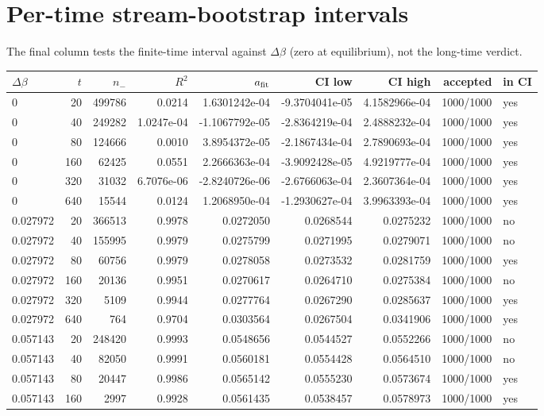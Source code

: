 \documentclass[10pt]{article}
\begin{document}
\section*{Per-time stream-bootstrap intervals}
The final column tests the finite-time interval against $\Delta\beta$ (zero at equilibrium), not the long-time verdict.
\scriptsize\begin{longtable}{lrrrrrrrl}
\toprule $\Delta\beta$ & $t$ & $n_-$ & $R^2$ & $a_{\rm fit}$ & CI low & CI high & accepted & in CI \\
\midrule\endhead
0 & 20 & 499786 & 0.0214 & 1.6301242e-04 & -9.3704041e-05 & 4.1582966e-04 & 1000/1000 & yes \\
0 & 40 & 249282 & 1.0247e-04 & -1.1067792e-05 & -2.8364219e-04 & 2.4888232e-04 & 1000/1000 & yes \\
0 & 80 & 124666 & 0.0010 & 3.8954372e-05 & -2.1867434e-04 & 2.7890693e-04 & 1000/1000 & yes \\
0 & 160 & 62425 & 0.0551 & 2.2666363e-04 & -3.9092428e-05 & 4.9219777e-04 & 1000/1000 & yes \\
0 & 320 & 31032 & 6.7076e-06 & -2.8240726e-06 & -2.6766063e-04 & 2.3607364e-04 & 1000/1000 & yes \\
0 & 640 & 15544 & 0.0124 & 1.2068950e-04 & -1.2930627e-04 & 3.9963393e-04 & 1000/1000 & yes \\
0.027972 & 20 & 366513 & 0.9978 & 0.0272050 & 0.0268544 & 0.0275232 & 1000/1000 & no \\
0.027972 & 40 & 155995 & 0.9979 & 0.0275799 & 0.0271995 & 0.0279071 & 1000/1000 & no \\
0.027972 & 80 & 60756 & 0.9979 & 0.0278058 & 0.0273532 & 0.0281759 & 1000/1000 & yes \\
0.027972 & 160 & 20136 & 0.9951 & 0.0270617 & 0.0264710 & 0.0275384 & 1000/1000 & no \\
0.027972 & 320 & 5109 & 0.9944 & 0.0277764 & 0.0267290 & 0.0285637 & 1000/1000 & yes \\
0.027972 & 640 & 764 & 0.9704 & 0.0303564 & 0.0267504 & 0.0341906 & 1000/1000 & yes \\
0.057143 & 20 & 248420 & 0.9993 & 0.0548656 & 0.0544527 & 0.0552266 & 1000/1000 & no \\
0.057143 & 40 & 82050 & 0.9991 & 0.0560181 & 0.0554428 & 0.0564510 & 1000/1000 & no \\
0.057143 & 80 & 20447 & 0.9986 & 0.0565142 & 0.0555230 & 0.0573674 & 1000/1000 & yes \\
0.057143 & 160 & 2997 & 0.9928 & 0.0561435 & 0.0538457 & 0.0578973 & 1000/1000 & yes \\

\end{longtable}
\end{document}
